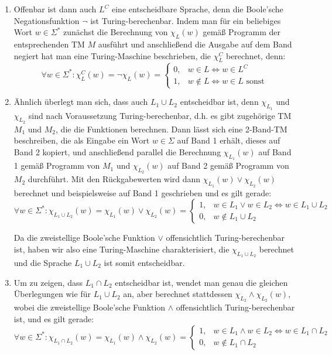 \documentclass{article}
\begin{document}
\begin{enumerate}
	\item Offenbar ist dann auch $L^C$ eine entscheidbare Sprache, denn die Boole'sche Negationsfunktion $\neg$ ist Turing-berechenbar. Indem man für ein beliebiges Wort $w \in \Sigma^*$ zunächst die Berechnung von $\chi_L(w)$ gemäß Programm der entsprechenden TM $M$ ausführt und anschließend die Ausgabe auf dem Band negiert hat man eine Turing-Maschine beschrieben, die $\chi_L^C$ berechnet, denn:
	\begin{equation}
		\forall w \in \Sigma^*: \chi_L^C(w) = \neg \chi_L(w) = \begin{cases}
		0, &w \in L \Leftrightarrow w \in L^C\\
		1, &w \not\in L \Leftrightarrow w \in L \text{ sonst}
		\end{cases}
	\end{equation}
	
	\item Ähnlich überlegt man sich, dass auch $L_1 \cup L_2$ entscheidbar ist, denn $\chi_{L_1}$ und $\chi_{L_2}$ sind nach Voraussetzung Turing-berechenbar, d.h. es gibt zugehörige TM $M_1$ und $M_2$, die die Funktionen berechnen. Dann lässt sich eine 2-Band-TM beschreiben, die als Eingabe ein Wort $w\in \Sigma$ auf Band 1 erhält, dieses auf Band 2 kopiert, und anschließend parallel die Berechnung $\chi_{L_1}(w)$ auf Band 1 gemäß Programm von $M_1$ und $\chi_{L_2}(w)$ auf Band 2 gemäß Programm von $M_2$ durchführt. Mit den Rückgabewerten wird dann $\chi_{L_1}(w) \lor \chi_{L_2}(w)$ berechnet und beispielsweise auf Band 1 geschrieben und es gilt gerade:
	\begin{equation}
		\forall w \in \Sigma^* : \chi_{L_1 \cup L_2}(w) = \chi_{L_1}(w) \lor \chi_{L_2}(w) = \begin{cases}
		1, &w\in L_1 \lor w\in L_2 \Leftrightarrow w \in L_1\cup L_2 \\
		0, &w \not\in L_1\cup L_2
		\end{cases}
	\end{equation}
	
	Da die zweistellige Boole'sche Funktion $\lor$ offensichtlich Turing-berechenbar ist, haben wir also eine Turing-Maschine charakterisiert, die $\chi_{L_1 \cup L_2}$ berechnet und die Sprache $L_1 \cup L_2$ ist somit entscheidbar.
	
	\item Um zu zeigen, dass $L_1\cap L_2$ entscheidbar ist, wendet man genau die gleichen Überlegungen wie für $L_1\cup L_2$ an, aber berechnet stattdessen $\chi_{L_2} \land \chi_{L_2}(w)$, wobei die zweistellige Boole'sche Funktion $\land$ offensichtlich Turing-berechenbar ist, und es gilt gerade:
	\begin{equation}
		\forall w \in \Sigma^* : \chi_{L_1 \cap L_2}(w) = \chi_{L_1}(w) \land \chi_{L_2}(w) = \begin{cases}
		1, &w\in L_1 \land w\in L_2 \Leftrightarrow w \in L_1\cap L_2 \\
		0, &w \not\in L_1\cap L_2
		\end{cases}
	\end{equation}
	

\end{enumerate}
\end{document}
